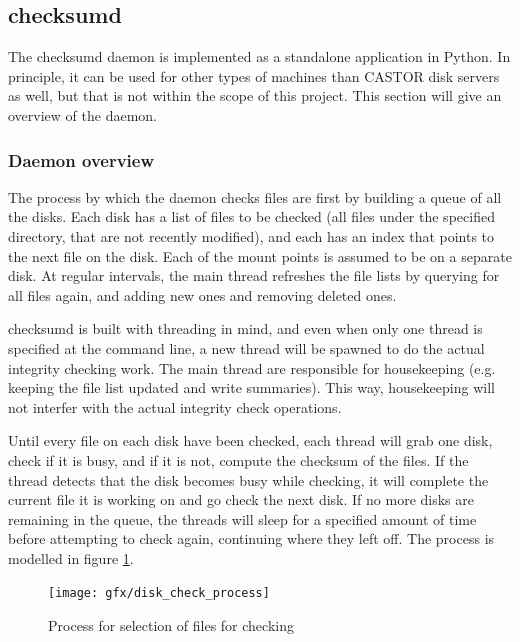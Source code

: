 \subsection{checksumd}
\label{sec:checksumd_overview}
The checksumd daemon is implemented as a standalone application in Python. In principle, it can be used for other types of machines than CASTOR disk servers as well, but that is not within the scope of this project. This section will give an overview of the daemon.

\subsubsection{Daemon overview}

The process by which the daemon checks files are first by building a queue of all the disks. Each disk has a list of files to be checked (all files under the specified directory, that are not recently modified), and each has an index that points to the next file on the disk. Each of the mount points is assumed to be on a separate disk. At regular intervals, the main thread refreshes the file lists by querying for all files again, and adding new ones and removing deleted ones. 

checksumd is built with threading in mind, and even when only one thread is specified at the command line, a new thread will be spawned to do the actual integrity checking work. The main thread are responsible for housekeeping (e.g. keeping the file list updated and write summaries). This way, housekeeping will not interfer with the actual integrity check operations. 

Until every file on each disk have been checked, each thread will grab one disk, check if it is busy, and if it is not, compute the checksum of the files. If the thread detects that the disk becomes busy while checking, it will complete the current file it is working on and go check the next disk. If no more disks are remaining in the queue, the threads will sleep for a specified amount of time before attempting to check again, continuing where they left off. The process is modelled in figure \ref{fig:checksum_process}.

\begin{figure}[ht]
\centering
\texttt{[image: gfx/disk\_check\_process]}
\caption{Process for selection of files for checking}
\label{fig:checksum_process}
\end{figure}

